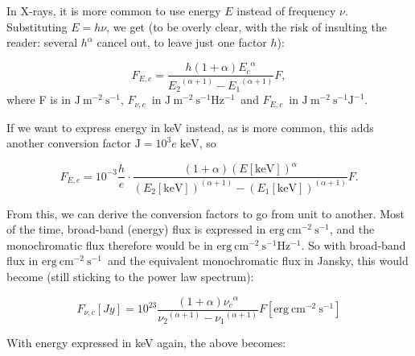 \documentclass[12pt,a4paper]{article}
\newcommand{\fvc}{\ensuremath{F_{\nu, c}}}
\newcommand{\fEc}{\ensuremath{F_{E, c}}}
\newcommand{\ergcmsqs}{\ensuremath{\mathrm{erg}\ \mathrm{cm}^{-2}\ \mathrm{s^{-1}}}}
\newcommand{\jmsqshz}{\ensuremath{\mathrm{J}\ \mathrm{m}^{-2}\ \mathrm{s^{-1}} \mathrm{Hz^{-1}}}}
\newcommand{\ergcmsqshz}{\ensuremath{\mathrm{erg}\ \mathrm{cm}^{-2}\ \mathrm{s^{-1}} \mathrm{Hz^{-1}}}}
\begin{document}
In X-rays, it is more common to use energy $E$ instead of frequency $\nu$. Substituting $E = h \nu$, we get (to be overly clear, with the risk of insulting the reader: several $h^{\alpha}$ cancel out, to leave just one factor $h$):

\begin{equation*}
\fEc = \frac{h (1+\alpha) {E_c}^{\alpha}}{{E_2}^{(\alpha+1)} - {E_1}^{(\alpha+1)}} F,
\end{equation*}
where F is in $\mathrm{J}\ \mathrm{m}^{-2}\ \mathrm{s^{-1}}$, \fvc\ in \jmsqshz\ and \fEc\ in $\mathrm{J}\ \mathrm{m}^{-2}\ \mathrm{s^{-1}} \mathrm{J^{-1}}$.

If we want to express energy in keV instead, as is more common, this adds another conversion factor $\mathrm{J} = 10^{3} e\; \mathrm{keV}$, so

\begin{equation*}
\fEc = 10^{-3} \frac{h}{e} \cdot \frac{(1+\alpha) {\left(E[\mathrm{keV}]\right)}^{\alpha}}{{\left(E_2[\mathrm{keV}]\right)}^{(\alpha+1)} - {\left(E_1[\mathrm{keV}]\right)}^{(\alpha+1)}} F.
\end{equation*}

From this, we can derive the conversion factors to go from unit to another. Most of the time, broad-band (energy) flux is expressed in \ergcmsqs, and the monochromatic flux therefore would be in \ergcmsqshz. So with broad-band flux in \ergcmsqs\ and the equivalent monochromatic flux in Jansky, this would become (still sticking to the power law spectrum):

\begin{equation*}
\fvc[Jy] = 10^{23} \frac{(1+\alpha) {\nu_c}^{\alpha}}{{\nu_2}^{(\alpha+1)} - {\nu_1}^{(\alpha+1)}} F[\ergcmsqs]
\end{equation*}

With energy expressed in keV again, the above becomes:
\end{document}
